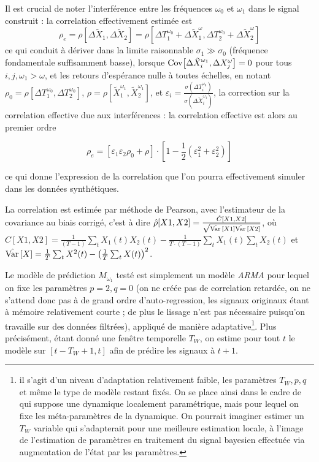 Il est crucial de noter l'interférence entre les fréquences $\omega_0$ et $\omega_1$ dans le signal construit : la correlation effectivement estimée est
\[
\rho_{e} = \rho \left[ \Delta \tilde{X}_1 , \Delta \tilde{X}_2 \right] = \rho \left[ \Delta T_1^{\omega_0} + \Delta \tilde{X}_1^{\omega} , \Delta T_2^{\omega_0} + \Delta \tilde{X}_2^{\omega}\right]
\]
ce qui conduit à dériver dans la limite raisonnable $\sigma_1 \gg \sigma_0$ (fréquence fondamentale suffisamment basse), lorsque $\operatorname{Cov}\!\left[\Delta \tilde{X}_i^{\omega_1},\Delta X_j^{\omega}\right]=0$ pour tous $i,j,\omega_1 > \omega$, et les retours d'espérance nulle à toutes échelles, en notant $\rho_0 = \rho \left[ \Delta T_1^{\omega_0} , \Delta T_2^{\omega_0} \right]$, $\rho = \rho \left[  \tilde{X}_1^{\omega_1} , \tilde{X}_2^{\omega_1} \right]$, et $\varepsilon_i = \frac{\sigma (\Delta T_i^{\omega_0})}{\sigma \left( \Delta \tilde{X}_i^{\omega_1}\right)}$, la correction sur la correlation effective due aux interférences : la correlation effective est alors au premier ordre

\begin{equation}
\label{eq:eff_corr}
\rho_e = \left[ \varepsilon_1 \varepsilon_2 \rho_0 + \rho \right] \cdot \left[ 1 - \frac{1}{2}\left(\varepsilon_1^2 + \varepsilon_2^2 \right) \right]
\end{equation}

{\noindent}ce qui donne l'expression de la correlation que l'on pourra effectivement simuler dans les données synthétiques.

La correlation est estimée par méthode de Pearson, avec l'estimateur de la covariance au biais corrigé, c'est à dire $\hat{\rho}[X1,X2] = \frac{\hat{C}[X1,X2]}{\sqrt{\hat{\operatorname{Var}{}}[X1]\hat{\operatorname{Var}{}}[X2]}}$, où $\hat{C}[X1,X2] = \frac{1}{(T-1)}\sum_{t} X_1(t)X_2(t) - \frac{1}{T\cdot (T-1)} \sum_t X_1(t) \sum_t X_2(t)$ et $\hat{\operatorname{Var}{}}[X] = \frac{1}{T}\sum_t{X^2(t)}-\left(\frac{1}{T}\sum_tX(t)\right)^2$.

Le modèle de prédiction $M_{\omega_1}$ testé est simplement un modèle \emph{ARMA} pour lequel on fixe les paramètres $p=2,q=0$ (on ne créée pas de correlation retardée, on ne s'attend donc pas à de grand ordre d'auto-regression, les signaux originaux étant à mémoire relativement courte ; de plus le lissage n'est pas nécessaire puisqu'on travaille sur des données filtrées), appliqué de manière adaptative\footnote{il s'agit d'un niveau d'adaptation relativement faible, les paramètres $T_W,p,q$ et même le type de modèle restant fixés. On se place ainsi dans le cadre de~\cite{potiron2016estimating} qui suppose une dynamique localement paramétrique, mais pour lequel on fixe les méta-paramètres de la dynamique. On pourrait imaginer estimer un $T_W$ variable qui s'adapterait pour une meilleure estimation locale, à l'image de l'estimation de paramètres en traitement du signal bayesien effectuée via augmentation de l'état par les paramètres.}. Plus précisément, étant donné une fenêtre temporelle $T_W$, on estime pour tout $t$ le modèle sur $[t-T_W+1,t]$ afin de prédire les signaux à $t+1$.


